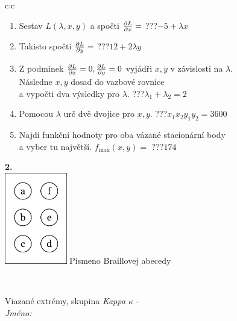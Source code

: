 \documentclass[10pt]{report}
\begin{document}
\begin{tabular}{c:c}
\begin{minipage}[c][104.5mm][t]{0.5\linewidth}
\begin{center}
\begin{minipage}{0.79\linewidth}
\begin{center}
\begin{varwidth}{\linewidth}
\begin{enumerate}
\item Sestav $L(\lambda,x,y)$ a spočti $\pdv{L}{x}=$\quad \dotfill\; ???\;\dotfill \quad $-5+\lambda x$
\item Takisto spočti $\pdv{L}{y}=$\quad \dotfill\; ???\;\dotfill \quad $12+2\lambda y$
\item Z podmínek $\pdv{L}{x}=0 , \pdv{L}{y}=0$ vyjádři $x,y$ v závislosti na $\lambda$.\\ \phantom{xxxxxx}Následne $x,y$ dosaď do vazbové rovnice\\ \phantom{xxxxxx}a vypočti dva výsledky pro $\lambda$.\quad \dotfill\; ???\;\dotfill \quad $\lambda_1+\lambda_2=2$
\item Pomocou $\lambda$ urč dvě dvojice pro $x,y$.\quad \dotfill\; ???\;\dotfill \quad $x_1 x_2 y_1 y_2=3600$
\item Najdi funkční hodnoty pro oba vázané stacionární body\\ \phantom{xxxxxx}a vyber tu najvětší. $f_{\text{max}}(x,y)=$\quad \dotfill\; ???\;\dotfill \quad $174$
\end{enumerate}
\end{varwidth}
\end{center}
\end{minipage}
\begin{minipage}{0.20\linewidth}
\begin{center}
{\Huge\bfseries 2.} \\[2mm]
\includegraphics[height=40mm]{../images/braille.png}
{\small Písmeno Braillovej abecedy}
\end{center}
\end{minipage}
\end{center}
\end{minipage}
\\ \hdashline
\begin{minipage}[c][104.5mm][t]{0.5\linewidth}
\begin{center}
\vspace{7mm}
{\huge Viazané extrémy, skupina \textit{Kappa $\kappa$} -}\\[5mm]
\textit{Jméno:}\phantom{xxxxxxxxxxxxxxxxxxxxxxxxxxxxxxxxxxxxxxxxxxxxxxxxxxxxxxxxxxxxxxxxx}\\[5mm]

\end{center}
\end{minipage}
\end{tabular}
\end{document}

